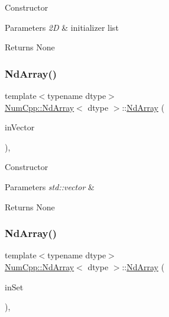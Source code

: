 Constructor


\begin{DoxyParams}{Parameters}
{\em 2D} & initializer list \\
\hline
\end{DoxyParams}
\begin{DoxyReturn}{Returns}
None 
\end{DoxyReturn}
\mbox{\label{class_num_cpp_1_1_nd_array_aa10a04577f13894e5e4b5154cf7a278f}} 
\subsubsection{\texorpdfstring{Nd\+Array()}{NdArray()}\hspace{0.1cm}{\footnotesize\ttfamily [7/12]}}
{\footnotesize\ttfamily template$<$typename dtype$>$ \\
\mbox{\hyperlink{class_num_cpp_1_1_nd_array}{Num\+Cpp\+::\+Nd\+Array}}$<$ dtype $>$\+::\mbox{\hyperlink{class_num_cpp_1_1_nd_array}{Nd\+Array}} (\begin{DoxyParamCaption}\item[{const std\+::vector$<$ dtype $>$ \&}]{in\+Vector }\end{DoxyParamCaption})\hspace{0.3cm}{\ttfamily [inline]}, {\ttfamily [explicit]}}

Constructor


\begin{DoxyParams}{Parameters}
{\em std\+::vector} & \\
\hline
\end{DoxyParams}
\begin{DoxyReturn}{Returns}
None 
\end{DoxyReturn}
\mbox{\label{class_num_cpp_1_1_nd_array_ae0c5a43e4a6eb936dbfe9a11cdf65e65}} 
\subsubsection{\texorpdfstring{Nd\+Array()}{NdArray()}\hspace{0.1cm}{\footnotesize\ttfamily [8/12]}}
{\footnotesize\ttfamily template$<$typename dtype$>$ \\
\mbox{\hyperlink{class_num_cpp_1_1_nd_array}{Num\+Cpp\+::\+Nd\+Array}}$<$ dtype $>$\+::\mbox{\hyperlink{class_num_cpp_1_1_nd_array}{Nd\+Array}} (\begin{DoxyParamCaption}\item[{const std\+::set$<$ dtype $>$ \&}]{in\+Set }\end{DoxyParamCaption})\hspace{0.3cm}{\ttfamily [inline]}, {\ttfamily [explicit]}}

